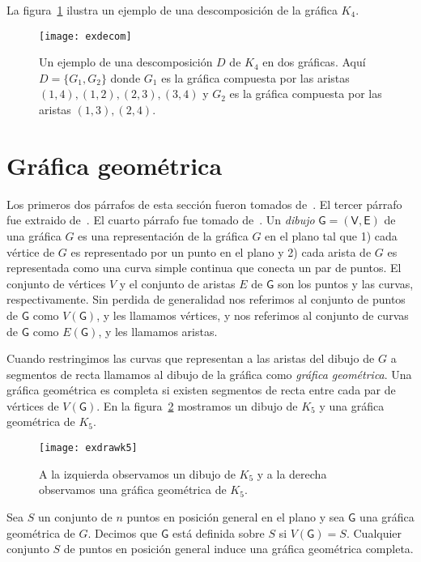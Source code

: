 La figura~\ref{fig:exdecom} ilustra un ejemplo de una descomposición de la gráfica $K_4$.
\begin{figure}[htbp]
  \centering
  \texttt{[image: exdecom]}
  \caption{Un ejemplo de una descomposición $D$ de $K_4$ en dos gráficas.
  Aquí $D=\{G_1,G_2\}$ donde $G_1$ es la gráfica compuesta por las aristas $(1,4),(1,2),(2,3),(3,4)$ y
  $G_2$ es la gráfica compuesta por las aristas $(1,3),(2,4)$.}
  \label{fig:exdecom}
\end{figure}
\section{Gráfica geométrica}
Los primeros dos párrafos de esta sección fueron tomados de~\cite{Pach2013}. El tercer párrafo
fue extraido de~\cite{Lara2019}. El cuarto párrafo fue tomado de~\cite{Pach2011}.
Un \emph{dibujo} $\mathsf{G}=(\mathsf{V},\mathsf{E})$ de una gráfica $G$ es una representación de la
gráfica $G$ en el plano tal que 1) cada vértice de $G$ es representado por un punto en el plano
y 2) cada arista de $G$ es representada como una curva simple continua que conecta un par de puntos.
El conjunto de vértices $V$ y el conjunto de aristas $E$ de $\mathsf{G}$
son los puntos y las curvas, respectivamente. Sin perdida de generalidad nos referimos al
conjunto de puntos de $\mathsf{G}$ como $V(\mathsf{G})$, y les llamamos vértices, y nos
referimos al conjunto de curvas de $\mathsf{G}$ como $E(\mathsf{G})$, y les llamamos aristas.

Cuando restringimos las curvas que representan a las aristas del dibujo de $G$
a segmentos de recta llamamos al dibujo de la gráfica como \emph{gráfica geométrica}.
Una gráfica geométrica es completa si existen segmentos de recta entre cada par de vértices
de $V(\mathsf{G})$. En la figura~\ref{fig:exdrawk5} mostramos un dibujo de $K_5$ y una
gráfica geométrica de $K_5$.
\begin{figure}[htpb]
  \centering
  \texttt{[image: exdrawk5]}
  \caption{A la izquierda observamos un dibujo de $K_5$ y a la derecha observamos
  una gráfica geométrica de $K_5$.}
  \label{fig:exdrawk5}
\end{figure}

Sea $S$ un conjunto de $n$ puntos en posición general en el plano y sea $\mathsf{G}$
una gráfica geométrica de $G$. Decimos que $\mathsf{G}$ está definida sobre $S$ si $V(\mathsf{G}) = S$.
Cualquier conjunto $S$ de puntos en posición general induce una gráfica geométrica completa.

